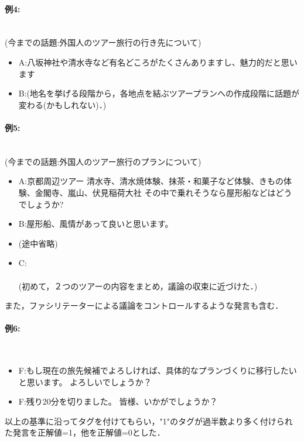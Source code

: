 \paragraph{例4:}\ \\
(今までの話題:外国人のツアー旅行の行き先について)
\begin{itemize}
\item A:八坂神社や清水寺など有名どころがたくさんありますし、魅力的だと思います
\item B:(地名を挙げる段階から，各地点を結ぶツアープランへの作成段階に話題が変わる(かもしれない)．)
\end{itemize}

\paragraph{例5:}\ \\
(今までの話題:外国人のツアー旅行のプランについて)
\begin{itemize}
\item A:京都周辺ツアー
 清水寺、清水焼体験、抹茶・和菓子など体験、きもの体験、金閣寺、嵐山、伏見稲荷大社
 その中で乗れそうなら屋形船などはどうでしょうか?
\item B:屋形船、風情があって良いと思います。
\item (途中省略)
\item C: 
 \\
 \\
 (初めて，２つのツアーの内容をまとめ，議論の収束に近づけた．)
 \end{itemize}
また，ファシリテーターによる議論をコントロールするような発言も含む．
\paragraph{例6:}\ \\
\begin{itemize}
\item F:もし現在の旅先候補でよろしければ、具体的なプランづくりに移行したいと思います。
 よろしいでしょうか？
\item F:残り20分を切りました。
 皆様、いかがでしょうか？
\end{itemize}
以上の基準に沿ってタグを付けてもらい，"1"のタグが過半数より多く付けられた発言を正解値=1，他を正解値=0とした．

